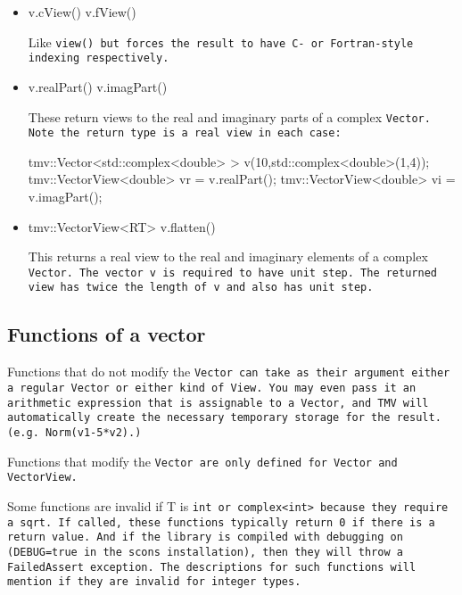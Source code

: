 \begin{itemize}
\item
\begin{tmvcode}
v.cView()
v.fView()
\end{tmvcode}
Like \tt{view()} but forces the result to have C- or Fortran-style indexing respectively.

\item
\begin{tmvcode}
v.realPart()
v.imagPart()
\end{tmvcode}
These return views to the real and imaginary parts of a complex \tt{Vector}.
Note the return type is a real view in each case:
\begin{tmvcode}
tmv::Vector<std::complex<double> > v(10,std::complex<double>(1,4));
tmv::VectorView<double> vr = v.realPart();
tmv::VectorView<double> vi = v.imagPart();
\end{tmvcode}

\item
\begin{tmvcode}
tmv::VectorView<RT> v.flatten()
\end{tmvcode}
This returns a real view to the real and imaginary elements of a complex \tt{Vector}. 
The vector \tt{v} is required to have unit step.  The returned view has twice the 
length of \tt{v} and also has unit step.

\end{itemize}

\subsection{Functions of a vector }
\label{Vector_Functions}

Functions that do not modify the \tt{Vector} 
can take as their argument either a regular \tt{Vector} or either
kind of \tt{View}.  You may even pass it an arithmetic expression that is
assignable to a \tt{Vector}, and TMV will automatically create the 
necessary temporary storage for the result.  (e.g. \tt{Norm(v1-5*v2)}.)

Functions that modify the \tt{Vector} are only defined for 
\tt{Vector} and \tt{VectorView}.

Some functions are invalid if T is \tt{int} or \tt{complex<int>} because they require 
a \tt{sqrt}.  If called, these functions typically return \tt{0} if there is a return value.
And if the library is compiled with debugging on (\tt{DEBUG=true} in the scons installation),
then they will throw a \tt{FailedAssert} exception.  The descriptions for such functions
will mention if they are invalid for integer types.


